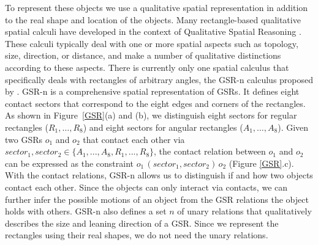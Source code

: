 \documentclass[letterpaper]{article}
\begin{document}
To represent these objects we use a qualitative spatial representation in addition to the real shape and location of the objects. Many rectangle-based qualitative spatial calculi \cite{balbiani1998model,cohn2012thinking,sokeh2013efficient} have developed in the context of Qualitative Spatial Reasoning \cite{cohn2008qualitative}. These calculi typically deal with one or more spatial aspects such as topology, size, direction, or distance, and make a number of qualitative distinctions according to these aspects. There is currently only one spatial calculus that specifically deals with rectangles of arbitrary angles, the GSR-n calculus proposed by \cite{Ge2013}. GSR-n is a comprehensive spatial representation of GSRs. It defines eight contact sectors that correspond to the eight edges and corners of the rectangles. As shown in Figure~\ref{GSR}(a) and (b), we distinguish eight sectors for regular rectangles ($R_1,\ldots,R_8$) and eight sectors for angular rectangles ($A_1,\ldots,A_8$). Given two GSRs $o_1$ and $o_2$ that contact each other via $sector_1, sector_2 \in \{A_1, ..., A_8, R_1, ..., R_8\}$, the contact relation between $o_1$ and $o_2$ can be expressed as the constraint $o_1 \, (sector_1, sector_2) \, o_2$ (Figure \ref{GSR}.c). With the contact relations, GSR-n allows us to distinguish if and how two objects contact each other. Since the objects can only interact via contacts, we can further infer the possible motions of an object from the GSR relations the object holds with others. GSR-n also defines a set $n$ of unary relations that qualitatively describes the size and leaning direction of a GSR. Since we represent the rectangles using their real shapes, we do not need the unary relations. 
\end{document}
